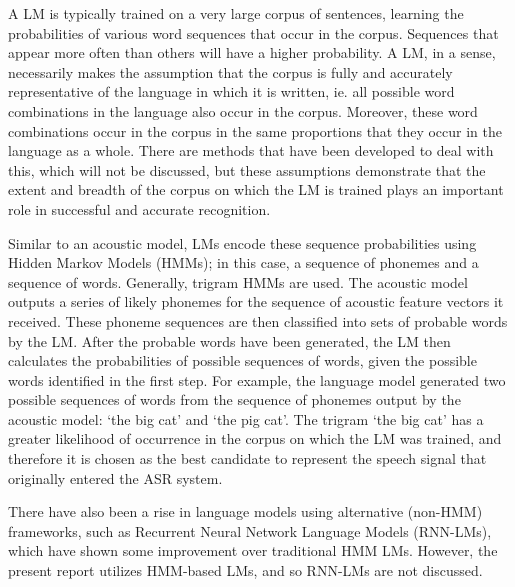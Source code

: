 A LM is typically trained on a very large corpus of sentences, learning the probabilities of various word sequences that occur in the corpus.  Sequences that appear more often than others will have a higher probability.  A LM, in a sense, necessarily makes the assumption that the corpus is fully and accurately representative of the language in which it is written, ie. all possible word combinations in the language also occur in the corpus. Moreover, \DIFaddbegin {}\DIFaddend these word combinations occur in the corpus in the same proportions that they occur in the language as a whole.  There are methods that have been developed to deal with this, which will not be discussed, but these assumptions demonstrate that the extent and breadth of the corpus on which the LM is trained plays an important role in successful and accurate recognition.  

Similar to an acoustic model, LMs encode these sequence probabilities using Hidden Markov Models (HMMs); in this case, a sequence of phonemes and a sequence of words.  Generally, trigram HMMs are used.  
The acoustic model outputs a series of likely phonemes for the sequence of acoustic feature vectors it received.  These phoneme sequences are then classified into sets of probable words by the LM.  After the probable words have been generated, the LM then calculates the probabilities of possible sequences of words, given the possible words identified in the first step.  For example, the language model generated two possible sequences of words from the sequence of phonemes output by the acoustic model: `the big cat' and `the pig cat'.  The trigram `the big cat' has a \DIFdelbegin {}\DIFdelend greater likelihood of occurrence in the corpus on which the LM was trained, and therefore it is chosen as the best candidate to represent the speech signal that originally entered the ASR system.  \DIFaddbegin {}\DIFaddend 

There have also been a rise in language models using alternative (non-HMM) frameworks, such as Recurrent Neural Network Language Models (RNN-LMs), which have shown some improvement over traditional HMM LMs.  However, the present report utilizes HMM-based LMs, and so RNN-LMs are not discussed.


